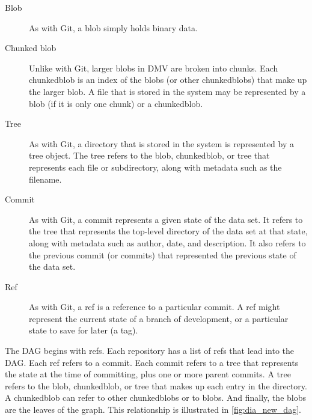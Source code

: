 \begin{description}

    \item[Blob] As with Git, a \gls{blob} simply holds binary data.

    \item[Chunked blob] Unlike with Git, larger \glspl{blob} in \gls{DMV} are
        broken into chunks. Each \gls{chunkedblob} is an index of the
        \glspl{blob} (or other \glspl{chunkedblob}) that make up the larger
        \gls{blob}. A file that is stored in the system may be represented by a
        \gls{blob} (if it is only one chunk) or a \gls{chunkedblob}.

    \item[Tree] As with Git, a directory that is stored in the system is
        represented by a \gls{tree} object. The \gls{tree} refers to the
        \gls{blob}, \gls{chunkedblob}, or \gls{tree} that represents each file
        or subdirectory, along with metadata such as the filename.

    \item[Commit] As with Git, a \gls{commit} represents a given state of the
        data set. It refers to the \gls{tree} that represents the top-level
        directory of the data set at that state, along with metadata such as
        author, date, and description. It also refers to the previous
        \gls{commit} (or \glspl{commit}) that represented the previous state of
        the data set.

    \item[Ref] As with Git, a \gls{ref} is a reference to a particular
        \gls{commit}. A \gls{ref} might represent the current state of a branch of
        development, or a particular state to save for later (a tag).

\end{description}

The \gls{DAG} begins with \glspl{ref}. Each repository has a list of \glspl{ref}
that lead into the \gls{DAG}. Each \gls{ref} refers to a \gls{commit}. Each
\gls{commit} refers to a \gls{tree} that represents the state at the time of
committing, plus one or more parent \glspl{commit}. A \gls{tree} refers to the
\gls{blob}, \gls{chunkedblob}, or \gls{tree} that makes up each entry in the
directory. A \gls{chunkedblob} can refer to other \glspl{chunkedblob} or to
\glspl{blob}. And finally, the \glspl{blob} are the leaves of the graph. This
relationship is illustrated in \autoref{fig:dia_new_dag}.



